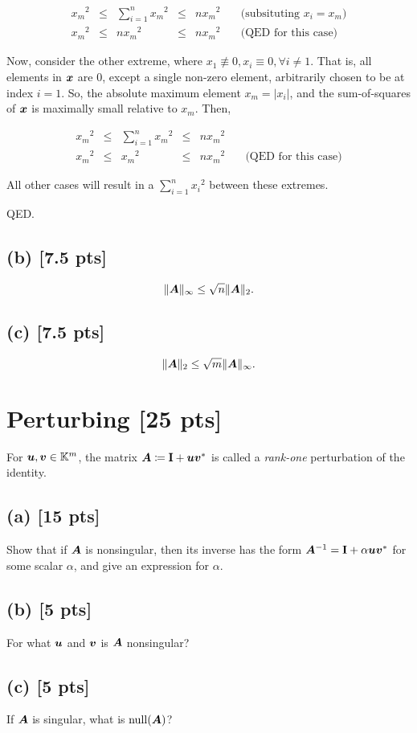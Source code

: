 \documentclass[twoside,10pt]{article}
\newcommand{\aln}[1]{\begin{align}#1\end{align}}
\newcommand{\s}{\enspace}
\begin{document}
\aln{
  {x_m}^2 &\leq &\sum_{i=1}^{n}{{x_m}^2} &\leq &n{x_m}^2 \s\s &\text{(subsituting $x_i = x_m$)}\\
  {x_m}^2 &\leq &n{x_m}^2 &\leq &n{x_m}^2 \s\s &\text{(QED for this case)}
}

Now, consider the other extreme, where $x_1 \not\equiv 0, x_i \equiv 0, \forall{i \neq 1}$.
That is, all elements in $\bm{x}$ are 0, except a single non-zero element, arbitrarily chosen to be at index $i=1$.
So, the absolute maximum element $x_m = |x_i|$, and the sum-of-squares of $\bm{x}$ is maximally small relative to $x_m$.
Then,

\aln{
  {x_m}^2 &\leq &\sum_{i=1}^{n}{{x_m}^2} &\leq &n{x_m}^2 \s\s\\
  {x_m}^2 &\leq &{x_m}^2 &\leq &n{x_m}^2 \s\s &\text{(QED for this case)}
}

All other cases will result in a $\sum_{i=1}^{n}{{x_i}^2}$ between these extremes.

QED.

\subsection*{(b) [7.5 pts]}
\begin{equation*}
  \|\bm{A}\|_{\infty} \leq \sqrt{n}\|\bm{A}\|_2.
\end{equation*}

\subsection*{(c) [7.5 pts]}
\begin{equation*}
  \|\bm{A}\|_{2} \leq \sqrt{m}\|\bm{A}\|_{\infty}.
\end{equation*}

\section{Perturbing [25 pts]}
For $\bm{u}, \bm{v} \in \mathbb{K}^m$, the matrix $\bm{A} \coloneqq \mathbf{I} + \bm{u}\bm{v}^{*}$ is called a \emph{rank-one} perturbation of the identity. 

\subsection*{(a) [15 pts]}
Show that if $\bm{A}$ is nonsingular, then its inverse has the form $\bm{A}^{-1} = \mathbf{I} + \alpha \bm{u}\bm{v}^{*}$ for some scalar $\alpha$, and give an expression for $\alpha$.

\subsection*{(b) [5 pts]}
For what $\bm{u}$ and $\bm{v}$ is $\bm{A}$ nonsingular? 

\subsection*{(c) [5 pts]} 
If $\bm{A}$ is singular, what is $\operatorname{null}(\bm{A})$?
\end{document}
